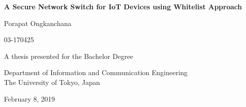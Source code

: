 \begin{titlepage}
    \begin{center}
            \vspace*{1cm}
            \Huge 
            \textbf{A Secure Network Switch for IoT Devices using Whitelist Approach}
            
            \vspace{4.0cm} 
            Porapat Ongkanchana 

            \vspace{0.6cm} 
            \Large 03-170425
            \vfill
            
            \Huge
            A thesis presented for the Bachelor Degree 
            \vspace{1cm}

            \Large 
            Department of Information and Communication Engineering \\
            The University of Tokyo, Japan
            
            February 8, 2019
    \end{center}
\end{titlepage}